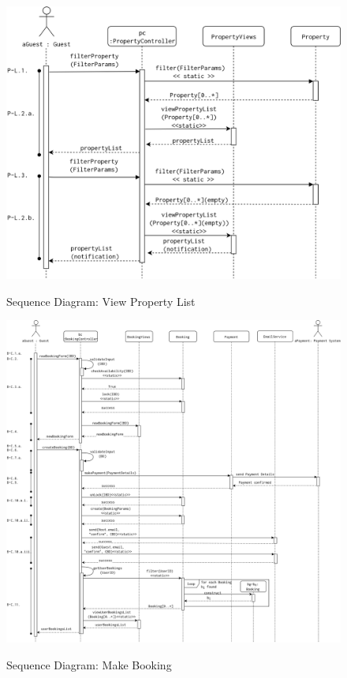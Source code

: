 \begin{figure}[H]
    \centering
    \includegraphics[width=13cm]{img/seq_diagrams/sqd_p_l.png} \\[0.5em]
    \caption{Sequence Diagram: View Property List}
    \label{Sequence Diagram: View Property List}
\end{figure}

\begin{figure}[H]
    \centering
    \includegraphics[width=\textwidth]{img/seq_diagrams/sqd_b_c.png} \\[0.5em]
    \caption{Sequence Diagram: Make Booking}
    \label{Sequence Diagram: Make Booking}
\end{figure}


